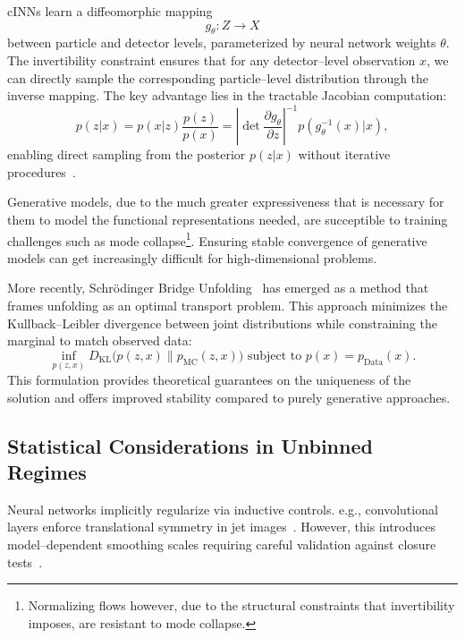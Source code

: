             cINNs learn a diffeomorphic mapping \[g_\theta: {Z} \to {X}\] between particle and detector levels, parameterized by neural network weights \(\theta\).
            The invertibility constraint ensures that for any detector--level observation \(x\), we can directly sample the corresponding particle--level distribution through the inverse mapping.
            The key advantage lies in the tractable Jacobian computation:
            \begin{equation}
                p(z|x) = p(x|z) \frac{p(z)}{p(x)} = \left|\det \frac{\partial g_\theta}{\partial z}\right|^{-1} p(g_\theta^{-1}(x)|x),
            \end{equation}
            enabling direct sampling from the posterior \(p(z|x)\) without iterative procedures~\cite{Bellagente2020InvertibleAgain}.

            Generative models, due to the much greater expressiveness that is necessary for them to model the functional representations needed, are succeptible to training challenges such as mode collapse\footnote{Normalizing flows however, due to the structural constraints that invertibility imposes, are resistant to mode collapse.}.
            Ensuring stable convergence of generative models can get increasingly difficult for high-dimensional problems.
            
            More recently, Schrödinger Bridge Unfolding~\cite{Butter2025GenerativeMapping} has emerged as a method that frames unfolding as an optimal transport problem.
            This approach minimizes the Kullback--Leibler divergence between joint distributions while constraining the marginal to match observed data:
            \begin{equation}
                \inf_{p(z,x)} D_{\text{KL}}\Big(p(z,x) \parallel p_{\text{MC}}(z,x)\Big) \text{ subject to } p(x) = p_{\text{Data}}(x).
            \end{equation}
            This formulation provides theoretical guarantees on the uniqueness of the solution and offers improved stability compared to purely generative approaches.
        \subsection{Statistical Considerations in Unbinned Regimes}  
            Neural networks implicitly regularize via inductive controls. 
            e.g., convolutional layers enforce translational symmetry in jet images~\cite{Kheddar2025ImageSurvey}.
            However, this introduces model--dependent smoothing scales requiring careful validation against closure tests~\cite{Cowan2011AsymptoticPhysics}.

